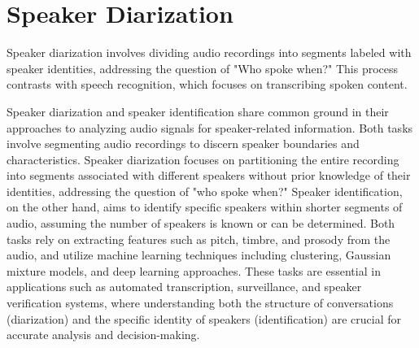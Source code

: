 \section{Speaker Diarization}
Speaker diarization involves dividing audio recordings into segments labeled with speaker identities, addressing the question of "Who spoke when?"
This process contrasts with speech recognition, which focuses on transcribing spoken content.

Speaker diarization and speaker identification share common ground in their approaches to analyzing audio signals for speaker-related information.
Both tasks involve segmenting audio recordings to discern speaker boundaries and characteristics. Speaker diarization focuses on partitioning the entire recording into segments
associated with different speakers without prior knowledge of their identities, addressing the question of "who spoke when?" Speaker identification, on the other hand, aims to identify specific
speakers within shorter segments of audio, assuming the number of speakers is known or can be determined. Both tasks rely on extracting features such as pitch, timbre, and prosody from the audio,
and utilize machine learning techniques including clustering, Gaussian mixture models, and deep learning approaches. These tasks are essential in applications such as automated transcription, surveillance, and speaker verification systems,
where understanding both the structure of conversations (diarization) and the specific identity of speakers (identification) are crucial for accurate analysis and decision-making.

